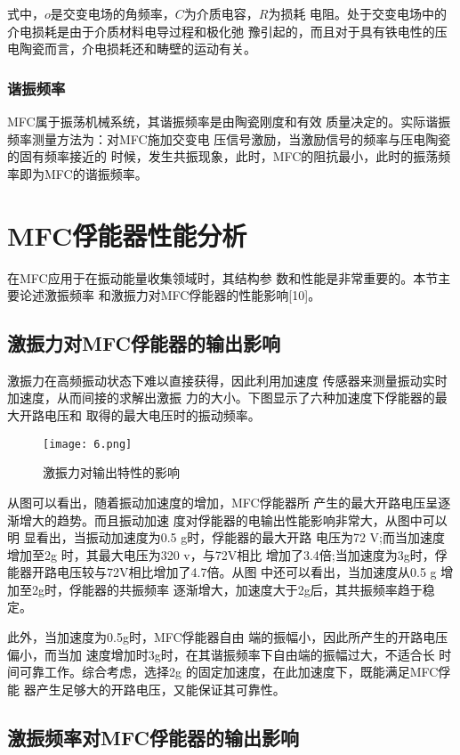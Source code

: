 \documentclass[lang=cn,11pt,a4paper,cite=authoryear]{elegantpaper}
\begin{document}
式中，$o$是交变电场的角频率，$C$为介质电容，$R$为损耗
电阻。处于交变电场中的介电损耗是由于介质材料电导过程和极化弛
豫引起的，而且对于具有铁电性的压电陶瓷而言，介电损耗还和畴壁的运动有关。


\subsubsection{谐振频率}

MFC属于振荡机械系统，其谐振频率是由陶瓷刚度和有效
质量决定的。实际谐振频率测量方法为：对MFC施加交变电
压信号激励，当激励信号的频率与压电陶瓷的固有频率接近的
时候，发生共振现象，此时，MFC的阻抗最小，此时的振荡频
率即为MFC的谐振频率。


\section{MFC俘能器性能分析}

在MFC应用于在振动能量收集领域时，其结构参
数和性能是非常重要的。本节主要论述激振频率
和激振力对MFC俘能器的性能影响[10]。

\subsection{激振力对MFC俘能器的输出影响}
激振力在高频振动状态下难以直接获得，因此利用加速度
传感器来测量振动实时加速度，从而间接的求解出激振
力的大小。下图显示了六种加速度下俘能器的最大开路电压和
取得的最大电压时的振动频率。

\begin{figure}[htbp]
  \centering
  \texttt{[image: 6.png]}
  \caption{激振力对输出特性的影响}
\end{figure}

从图可以看出，随着振动加速度的增加，MFC俘能器所
产生的最大开路电压呈逐渐增大的趋势。而且振动加速
度对俘能器的电输出性能影响非常大，从图中可以明
显看出，当振动加速度为0.5 g时，俘能器的最大开路
电压为72 V;而当加速度增加至2g 时，其最大电压为320 v，与72V相比
增加了3.4倍;当加速度为3g时，俘能器开路电压较与72V相比增加了4.7倍。从图
中还可以看出，当加速度从0.5 g 增加至2g时，俘能器的共振频率
逐渐增大，加速度大于2g后，其共振频率趋于稳定。

此外，当加速度为0.5g时，MFC俘能器自由
端的振幅小，因此所产生的开路电压偏小，而当加
速度增加时3g时，在其谐振频率下自由端的振幅过大，不适合长
时间可靠工作。综合考虑，选择2g
的固定加速度，在此加速度下，既能满足MFC俘能
器产生足够大的开路电压，又能保证其可靠性。

\subsection{激振频率对MFC俘能器的输出影响}
\end{document}
